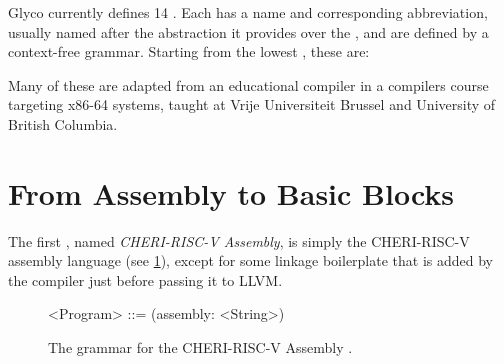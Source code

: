 \documentclass[main.tex]{subfiles}
\begin{document}
Glyco currently defines 14 \ils{}. Each \il{} has a name and corresponding abbreviation, usually named after the abstraction it provides over the \lowerlang{}, and are defined by a context-free grammar. Starting from the lowest \il{}, these are:


Many of these \ils{} are adapted from an educational compiler in a compilers course targeting x86-64 systems, taught at Vrije Universiteit Brussel \cite{:compcourse} and University of British Columbia.

\section{From Assembly to Basic Blocks}

The first \il{}, named \emph{CHERI-RISC-V Assembly}, is simply the CHERI-RISC-V assembly language (see \cref{bnf:s}), except for some linkage boilerplate that is added by the compiler just before passing it to LLVM.

\begin{figure}[ht]
	\begin{grammar}
		<Program> ::= (assembly: <String>)
	\end{grammar}
	\caption{The grammar for the CHERI-RISC-V Assembly \il{}.}
	\label{bnf:s}
\end{figure}


\biblio{}
\onlyinsubfile{\glsaddall\printglossaries}
\end{document}
